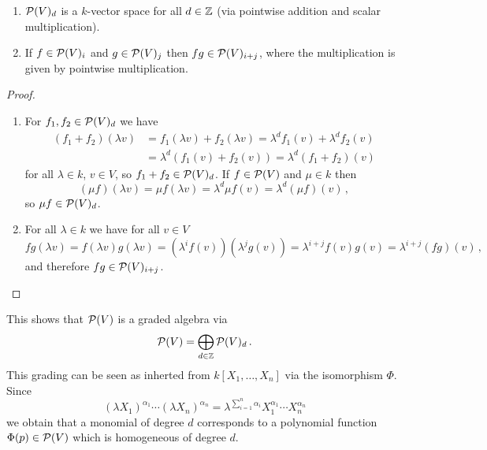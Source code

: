 \begin{lemma}
  \begin{enumerate}[label=\emph{\alph*)},leftmargin=*]
    \item
      $\mathcal{P}(V)_d$ is a $k$-vector space for all $d \in \mathbb{Z}$ (via pointwise addition and scalar multiplication).
    \item
      If $f \in \mathcal{P}(V)_i$ and $g \in \mathcal{P}(V)_j$ then $fg \in \mathcal{P}(V)_{i+j}$, where the multiplication is given by pointwise multiplication.
  \end{enumerate}
\end{lemma}
\begin{proof}
  \begin{enumerate}[label=\emph{\alph*)},leftmargin=*]
    \item For $f_1, f_2 \in \mathcal{P}(V)_d$ we have
      \begin{align*}
            (f_1+f_2)(\lambda v)
        &=  f_1(\lambda v) + f_2(\lambda v)
         =  \lambda^d f_1(v) + \lambda^d f_2(v) \\
        &=  \lambda^d (f_1(v) + f_2(v))
         =  \lambda^d (f_1 + f_2)(v)
      \end{align*}
      for all $\lambda \in k$, $v \in V$, so $f_1 + f_2 \in \mathcal{P}(V)_d$. If $f \in \mathcal{P}(V)$ and $\mu \in k$ then
      \[
          (\mu f)(\lambda v)
        = \mu f(\lambda v)
        = \lambda^d \mu f(v)
        = \lambda^d (\mu f)(v) \,,
      \]
      so $\mu f \in \mathcal{P}(V)_d$.
    \item
      For all $\lambda \in k$ we have for all $v \in V$
      \[
          fg(\lambda v)
        = f(\lambda v) g(\lambda v)
        = \left( \lambda^i f(v) \right)\left( \lambda^j g(v) \right)
        = \lambda^{i+j} f(v) g(v)
        = \lambda^{i+j} (fg)(v) \,,
      \]
      and therefore $fg \in \mathcal{P}(V)_{i+j}$.
    \qedhere
  \end{enumerate}
\end{proof}

This shows that $\mathcal{P}(V)$ is a graded algebra via
\[
      \mathcal{P}(V)
    = \bigoplus_{d \in \mathbb{Z}} \mathcal{P}(V)_d \,.
\]
This grading can be seen as inherted from $k[X_1, \dotsc, X_n]$ via the isomorphism $\Phi$. Since
\[
    (\lambda X_1)^{\alpha_1} \dotsm (\lambda X_n)^{\alpha_n}
  = \lambda^{\sum_{i=1}^n \alpha_i} X_1^{\alpha_1} \dotsm X_n^{\alpha_n}
\]
we obtain that a monomial of degree $d$ corresponds to a polynomial function $\Phi(p) \in \mathcal{P}(V)$ which is homogeneous of degree $d$.


